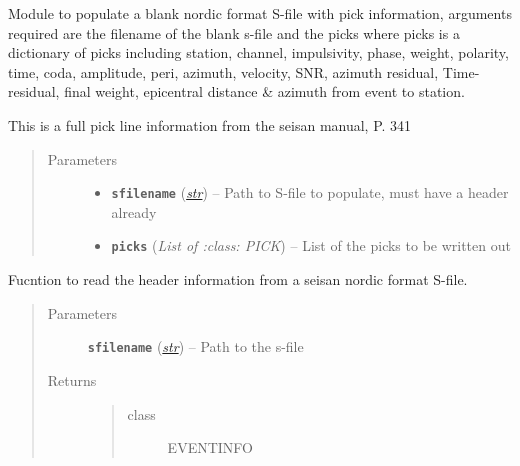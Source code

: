 \documentclass[a4paper,10pt,english]{sphinxmanual}
\begin{document}

\begin{fulllineitems}
\label{utils:Sfile_util.populateSfile}
Module to populate a blank nordic format S-file with pick information,
arguments required are the filename of the blank s-file and the picks
where picks is a dictionary of picks including station, channel,
impulsivity, phase, weight, polarity, time, coda, amplitude, peri, azimuth,
velocity, SNR, azimuth residual, Time-residual, final weight,
epicentral distance \& azimuth from event to station.

This is a full pick line information from the seisan manual, P. 341
\begin{quote}\begin{description}
\item[{Parameters}] \leavevmode\begin{itemize}
\item {} 
\textbf{\texttt{sfilename}} (\href{https://docs.python.org/library/functions.html\#str}{\emph{str}}) -- Path to S-file to populate, must have a header already

\item {} 
\textbf{\texttt{picks}} (\emph{List of :class: PICK}) -- List of the picks to be written out

\end{itemize}

\end{description}\end{quote}

\end{fulllineitems}


\begin{fulllineitems}
\label{utils:Sfile_util.readheader}
Fucntion to read the header information from a seisan nordic format S-file.
\begin{quote}\begin{description}
\item[{Parameters}] \leavevmode
\textbf{\texttt{sfilename}} (\href{https://docs.python.org/library/functions.html\#str}{\emph{str}}) -- Path to the s-file

\item[{Returns}] \leavevmode
\begin{quote}\begin{description}
\item[{class}] \leavevmode
EVENTINFO

\end{description}\end{quote}


\end{description}\end{quote}

\end{fulllineitems}
\end{document}
